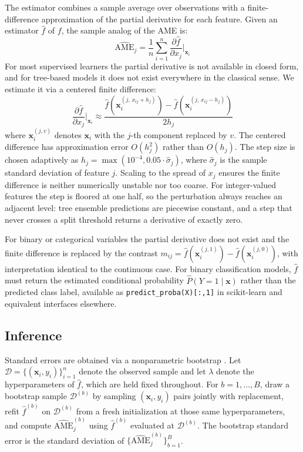 \documentclass[conference]{IEEEtran}
\begin{document}
	The estimator combines a sample average over observations with a finite-difference approximation of the partial derivative for each feature. Given an estimator $\hat{f}$ of $f$, the sample analog of the AME is:
	\begin{equation}
		\widehat{\mathrm{AME}}_j = \frac{1}{n} \sum_{i=1}^n \frac{\partial \hat{f}}{\partial x_j}\bigg|_{\mathbf{x}_i}
	\end{equation}
	For most supervised learners the partial derivative is not available in closed form, and for tree-based models it does not exist everywhere in the classical sense. We estimate it via a centered finite difference:
	\begin{equation}
		\frac{\partial \hat{f}}{\partial x_j}\bigg|_{\mathbf{x}_i} \approx \frac{\hat{f}\!\left(\mathbf{x}_i^{(j,\, x_{ij} + h_j)}\right) - \hat{f}\!\left(\mathbf{x}_i^{(j,\, x_{ij} - h_j)}\right)}{2h_j}
	\end{equation}
	where $\mathbf{x}_i^{(j,v)}$ denotes $\mathbf{x}_i$ with the $j$-th component replaced by $v$. The centered difference has approximation error $O(h_j^2)$ rather than $O(h_j)$. The step size is chosen adaptively as $h_j = \max(10^{-4}, 0.05 \cdot \hat{\sigma}_j)$, where $\hat{\sigma}_j$ is the sample standard deviation of feature $j$. Scaling to the spread of $x_j$ ensures the finite difference is neither numerically unstable nor too coarse. For integer-valued features the step is floored at one half, so the perturbation always reaches an adjacent level: tree ensemble predictions are piecewise constant, and a step that never crosses a split threshold returns a derivative of exactly zero.
	
	For binary or categorical variables the partial derivative does not exist and the finite difference is replaced by the contrast $m_{ij} = \hat{f}(\mathbf{x}_i^{(j,1)}) - \hat{f}(\mathbf{x}_i^{(j,0)})$, with interpretation identical to the continuous case. For binary classification models, $\hat{f}$ must return the estimated conditional probability $\hat{P}(Y=1 \mid \mathbf{x})$ rather than the predicted class label, available as \texttt{predict\_proba(X)[:,1]} in scikit-learn and equivalent interfaces elsewhere.
	
	\subsection{Inference}
	
	Standard errors are obtained via a nonparametric bootstrap \cite{efron1979, efrontibshirani1993}. Let $\mathcal{D} = \{(\mathbf{x}_i, y_i)\}_{i=1}^n$ denote the observed sample and let $\lambda$ denote the hyperparameters of $\hat{f}$, which are held fixed throughout. For $b = 1, \dots, B$, draw a bootstrap sample $\mathcal{D}^{(b)}$ by sampling $(\mathbf{x}_i, y_i)$ pairs jointly with replacement, refit $\hat{f}^{(b)}$ on $\mathcal{D}^{(b)}$ from a fresh initialization at those same hyperparameters, and compute $\widehat{\mathrm{AME}}_j^{(b)}$ using $\hat{f}^{(b)}$ evaluated at $\mathcal{D}^{(b)}$. The bootstrap standard error is the standard deviation of $\{\widehat{\mathrm{AME}}_j^{(b)}\}_{b=1}^B$.
	
\end{document}
